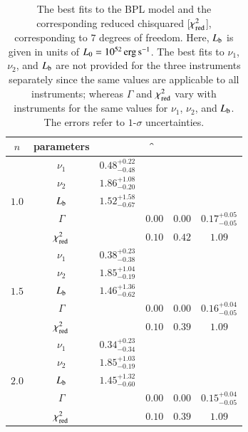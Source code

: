 \begin{table}
\caption[BPL model fits]{The best fits to the BPL model and the corresponding reduced chisquared [$\chi_{{\rm red}}^{2}$], corresponding to $7$ degrees of freedom. Here, $L_{\rm{b}}$ is given in units of $L_{0} = 10^{52}\, \rm erg \, s^{-1}$. The best fits to $\nu_1$, $\nu_2$, and $L_{\rm{b}}$ are not provided for the three instruments separately since the same values are applicable to all instruments; whereas $\Gamma$ and $\chi_{{\rm red}}^{2}$ vary with instruments for the same values for $\nu_1$, $\nu_2$, and $L_{\rm{b}}$. The errors refer to $1$-$\sigma$ uncertainties.}
\label{tab:BPL_fits--short}
\begin{center}
\begin{tabular}{|c|c|c|c|c|c|}
\hline
$n$ & parameters &  & \f & \s & \B \\
\hline
\multirow{5}{*}{$1.0$} & $\nu_1$ & $0.48 ^{+0.22} _{-0.48}$ & & & \\
 & $\nu_2$ & $1.86 ^{+1.08} _{-0.20}$ & & & \\
 & $L_{\rm{b}}$ & $1.52 ^{+1.58} _{-0.67}$ & & & \\
 & $\Gamma$ & & $0.00$ & $0.00$ & $0.17 ^{+0.05} _{-0.05}$ \\
 & $\chi_{{\rm red}}^{2}$ & & $0.10$ & $0.42$ & $1.09$ \\
\hline
\multirow{5}{*}{$1.5$} & $\nu_1$ & $0.38 ^{+0.23} _{-0.38}$ & & & \\
 & $\nu_2$ & $1.85 ^{+1.04} _{-0.19}$ & & & \\
 & $L_{\rm{b}}$ & $1.46 ^{+1.36} _{-0.62}$ & & & \\ 
 & $\Gamma$ & & $0.00$ & $0.00$ & $0.16 ^{+0.04} _{-0.05}$ \\
 & $\chi_{{\rm red}}^{2}$ & & $0.10$ & $0.39$ & $1.09$ \\
\hline
\multirow{5}{*}{$2.0$} & $\nu_1$ & $0.34 ^{+0.23} _{-0.34}$ & & & \\
 & $\nu_2$ & $1.85 ^{+1.03} _{-0.19}$ & & & \\
 & $L_{\rm{b}}$ & $1.45 ^{+1.32} _{-0.60}$ & & & \\
 & $\Gamma$ & & $0.00$ & $0.00$ & $0.15 ^{+0.04} _{-0.05}$ \\
 & $\chi_{{\rm red}}^{2}$ & & $0.10$ & $0.39$ & $1.09$ \\
\hline
\end{tabular}
\end{center}
\end{table}

